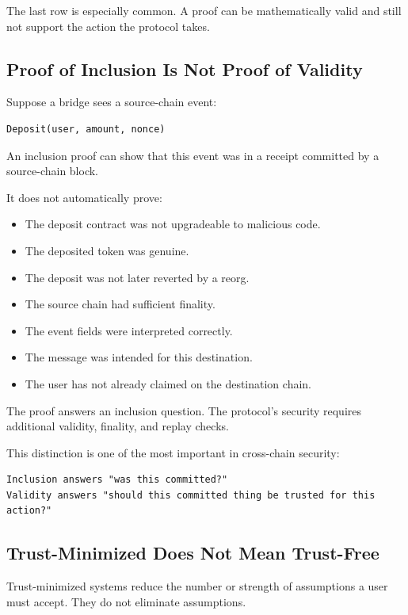 The last row is especially common. A proof can be mathematically valid
and still not support the action the protocol takes.

\subsection{Proof of Inclusion Is Not Proof of Validity}

Suppose a bridge sees a source-chain event:

\begin{lstlisting}
Deposit(user, amount, nonce)
\end{lstlisting}

An inclusion proof can show that this event was in a receipt committed
by a source-chain block.

It does not automatically prove:

\begin{itemize}
\tightlist
\item
  The deposit contract was not upgradeable to malicious code.
\item
  The deposited token was genuine.
\item
  The deposit was not later reverted by a reorg.
\item
  The source chain had sufficient finality.
\item
  The event fields were interpreted correctly.
\item
  The message was intended for this destination.
\item
  The user has not already claimed on the destination chain.
\end{itemize}

The proof answers an inclusion question. The protocol's security
requires additional validity, finality, and replay checks.

This distinction is one of the most important in cross-chain security:

\begin{lstlisting}
Inclusion answers "was this committed?"
Validity answers "should this committed thing be trusted for this action?"
\end{lstlisting}

\subsection{Trust-Minimized Does Not Mean Trust-Free}

Trust-minimized systems reduce the number or strength of assumptions a
user must accept. They do not eliminate assumptions.

